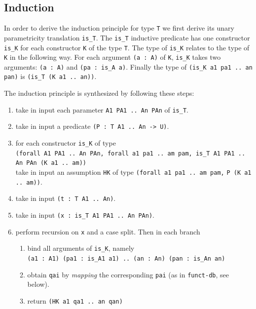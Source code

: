 \documentclass[a4paper,UKenglish,cleveref, autoref]{lipics-v2019}
\begin{document}
\subsection{Induction} %
\label{sec:induction}

In order to derive the induction principle for type
\lstinline+T+ we first derive its unary parametricity
translation \lstinline+is_T+. 
The \lstinline+is_T+ inductive
predicate has one constructor \lstinline+is_K+ for each
constructor \lstinline+K+ of the type \lstinline+T+.
The type of \lstinline+is_K+ relates to the type of
\lstinline+K+ in the following way. For each
argument \lstinline+(a : A)+
of \lstinline+K+, \lstinline+is_K+ takes two arguments:
\lstinline+(a : A)+ and \lstinline+(pa : is_A a)+.
Finally the type of \lstinline+(is_K a1 pa1 .. an pan)+ is
\lstinline+(is_T (K a1 .. an))+.

The induction principle is synthesized by following these steps:
\begin{enumerate}
\item take in input each parameter
  \lstinline+A1 PA1 .. An PAn+ of \lstinline+is_T+.
\item take in input a predicate \lstinline+(P : T A1 .. An -> U)+.
\item for each constructor \lstinline+is_K+ of
	type \\
		\lstinline+(forall A1 PA1 .. An PAn, forall a1 pa1 .. am pam, is_T A1 PA1 .. An PAn (K a1 .. am))+ \\
  take in input an assumption \lstinline+HK+ of type
		\lstinline+(forall a1 pa1 .. am pam,+
		\lstinline+P (K a1 .. am))+.
\item take in input \lstinline+(t : T A1 .. An)+.
\item take in input \lstinline+(x : is_T A1 PA1 .. An PAn)+.
\item perform recursion on \lstinline+x+ and a case split. Then
	in each branch
\begin{enumerate}
\item bind all arguments of \lstinline+is_K+, namely\\
  \lstinline+(a1 : A1) (pa1 : is_A1 a1) .. (an : An) (pan : is_An an)+
\item obtain
  \lstinline+qai+ by \emph{mapping} the corresponding
  \lstinline+pai+ (as in \lstinline+funct-db+, see below).
\item return \lstinline+(HK a1 qa1 .. an qan)+
\end{enumerate}
\end{enumerate}
\end{document}
